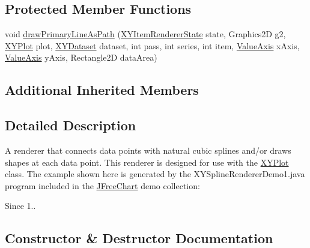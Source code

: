\subsection*{Protected Member Functions}
\begin{DoxyCompactItemize}
\item 
void \mbox{\hyperlink{classorg_1_1jfree_1_1chart_1_1renderer_1_1xy_1_1_x_y_spline_renderer_a0536eed3cfdb48f0ff43aa1c0d808f99}{draw\+Primary\+Line\+As\+Path}} (\mbox{\hyperlink{classorg_1_1jfree_1_1chart_1_1renderer_1_1xy_1_1_x_y_item_renderer_state}{X\+Y\+Item\+Renderer\+State}} state, Graphics2D g2, \mbox{\hyperlink{classorg_1_1jfree_1_1chart_1_1plot_1_1_x_y_plot}{X\+Y\+Plot}} plot, \mbox{\hyperlink{interfaceorg_1_1jfree_1_1data_1_1xy_1_1_x_y_dataset}{X\+Y\+Dataset}} dataset, int pass, int series, int item, \mbox{\hyperlink{classorg_1_1jfree_1_1chart_1_1axis_1_1_value_axis}{Value\+Axis}} x\+Axis, \mbox{\hyperlink{classorg_1_1jfree_1_1chart_1_1axis_1_1_value_axis}{Value\+Axis}} y\+Axis, Rectangle2D data\+Area)
\end{DoxyCompactItemize}
\subsection*{Additional Inherited Members}


\subsection{Detailed Description}
A renderer that connects data points with natural cubic splines and/or draws shapes at each data point. This renderer is designed for use with the \mbox{\hyperlink{}{X\+Y\+Plot}} class. The example shown here is generated by the {\ttfamily X\+Y\+Spline\+Renderer\+Demo1.\+java} program included in the \mbox{\hyperlink{classorg_1_1jfree_1_1chart_1_1_j_free_chart}{J\+Free\+Chart}} demo collection\+: ~\newline
~\newline
 

\begin{DoxySince}{Since}
1.. 
\end{DoxySince}


\subsection{Constructor \& Destructor Documentation}
\mbox{\label{classorg_1_1jfree_1_1chart_1_1renderer_1_1xy_1_1_x_y_spline_renderer_a5978e801cbd9410f9a8a3dd3b9373270}} 
